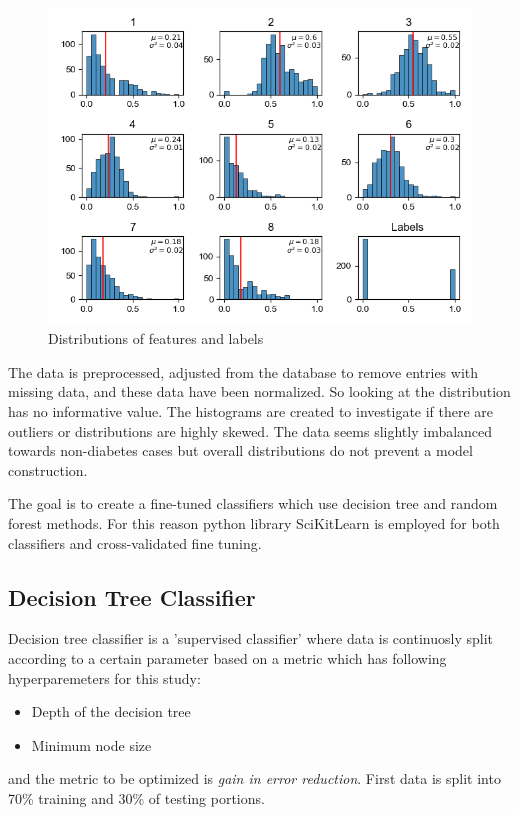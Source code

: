 \documentclass[11pt]{article}
\begin{document}
\begin{figure}[H]
\centering
\includegraphics[width=0.85\columnwidth]{pics/data.png}
\captionsetup{justification=centering}
\caption{Distributions of features and labels}
\label{fig:q2_data}
\end{figure}

The data is preprocessed, adjusted from the database to remove entries with missing data, and these data have been normalized. So looking at the distribution has no informative value. The histograms are created to investigate if there are outliers or distributions are highly skewed. The data seems slightly imbalanced towards non-diabetes cases but overall distributions do not prevent a model construction. \medskip

The goal is to create a fine-tuned classifiers which use decision tree and random forest methods. For this reason python library SciKitLearn is employed for both classifiers and cross-validated fine tuning. \medskip

\subsection{Decision Tree Classifier}
Decision tree classifier is a 'supervised classifier' where data is continuosly split according to a certain parameter based on a metric which has following hyperparemeters for this study:
\begin{itemize}
    \item Depth of the decision tree
    \item Minimum node size
\end{itemize}

and the metric to be optimized is \emph{gain in error reduction}. First data is split into 70\% training and 30\% of testing portions. \medskip
\end{document}
